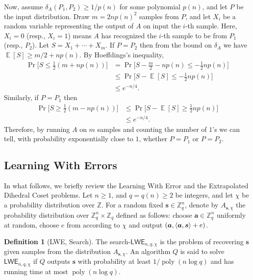 \documentclass[11pt]{article}
\theoremstyle{plain}
\theoremstyle{definition}
\newtheorem{definition}[theorem]{Definition}
\DeclareMathOperator{\poly}{poly}
\DeclareMathOperator{\E}{\mathbb{E}}
\DeclarePairedDelimiter{\lrang}{\langle}{\rangle}
\def\Z{\mathbb{Z}}
\def\lwe{\mathsf{LWE}}
\begin{document}
Now, assume $\delta_A(P_1, P_2) \ge 1 / p(n)$ for some polynomial $p(n)$, and let $P$ be the input distribution. Draw $m = 2np(n)^2$ samples from $P$, and let $X_i$ be a random variable representing the output of $A$ on input the $i$-th sample. Here, $X_i = 0$ (resp., $X_i = 1$) means $A$ has recognized the $i$-th sample to be from $P_1$ (resp., $P_2$). Let $S = X_1 + \cdots + X_m$. If $P = P_2$ then from the bound on $\delta_A$ we have $\E[S] \ge m / 2 + np(n)$. By Hoeffdings's inequality,
\begin{align*}
    \Pr\Big[ S \le \frac{1}{2} (m + np(n)) \Big]
    & = \Pr\Big[ S - \frac{m}{2} - np(n) \le -\frac{1}{2}np(n) \Big] \\
    & \le \Pr\Big[ S - \E[S] \le -\frac{1}{2}np(n) \Big] \\
    & \le e^{-n / 4}.
\end{align*}
Similarly, if $P = P_1$ then
\begin{align*}
    \Pr\Big[ S \ge \frac{1}{2} (m - np(n)) \Big]
    & \le \Pr\Big[ S - \E[S] \ge \frac{1}{2}np(n) \Big] \\
    & \le e^{-n / 4}.
\end{align*}
Therefore, by running $A$ on $m$ samples and counting the number of $1$'s we can tell, with probability exponentially close to $1$, whether $P = P_1$ or $P = P_2$.



\subsection{Learning With Errors}

In what follows, we briefly review the Learning With Error and the Extrapolated Dihedral Coset problems. Let $n \ge 1$, and $q = q(n) \ge 2$ be integers, and let $\chi$ be a probability distribution over $\Z$. For a random fixed $\bm{s} \in \Z_q^n$, denote by $A_{\bm{s}, \chi}$ the probability distribution over $\Z_q^n \times \Z_q$ defined as follows: choose $\bm{a} \in \Z_q^n$ uniformly at random, choose $e$ from according to $\chi$ and output  $(\bm{a}, \lrang{\bm{a}, \bm{s}} + e)$.

\begin{definition}[LWE, Search]
The search-$\lwe_{n, q, \chi}$ is the problem of recovering $\bm{s}$ given samples from the distribution $A_{\bm{s}, \chi}$. An algorithm $Q$ is said to solve $\lwe_{n, q, \chi}$ if $Q$  outputs $\bm{s}$ with probability at least $1 / \poly(n\log q)$ and has running time at most $\poly(n \log q)$.
\end{definition}
\end{document}
